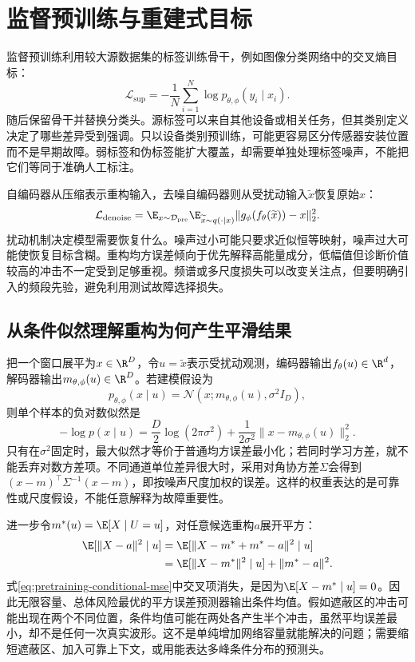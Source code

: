\section{监督预训练与重建式目标}
监督预训练利用较大源数据集的标签训练骨干，例如图像分类网络中的交叉熵目标\cite{he2016resnet}：
\begin{equation}
 \mathcal L_{\mathrm{sup}}=-\frac1N\sum_{i=1}^{N}
 \log p_{\theta,\phi}(y_i\mid x_i).
\end{equation}
随后保留骨干并替换分类头。源标签可以来自其他设备或相关任务，但其类别定义决定了哪些差异受到强调。只以设备类别预训练，可能更容易区分传感器安装位置而不是早期故障。弱标签和伪标签能扩大覆盖，却需要单独处理标签噪声，不能把它们等同于准确人工标注。

自编码器从压缩表示重构输入，去噪自编码器则从受扰动输入$\widetilde x$恢复原始$x$\cite{vincent2008denoising}：
\begin{equation}
 \mathcal L_{\mathrm{denoise}}
 =\E_{x\sim\mathcal D_{\mathrm{pre}}}\E_{\widetilde x\sim q(\cdot\mid x)}
 \|g_\phi(f_\theta(\widetilde x))-x\|_2^2.
\end{equation}
扰动机制决定模型需要恢复什么。噪声过小可能只要求近似恒等映射，噪声过大可能使恢复目标含糊。重构均方误差倾向于优先解释高能量成分，低幅值但诊断价值较高的冲击不一定受到足够重视。频谱或多尺度损失可以改变关注点，但要明确引入的频段先验，避免利用测试故障选择损失。

\subsection{从条件似然理解重构为何产生平滑结果}
把一个窗口展平为$x\in\R^D$，令$u=\widetilde x$表示受扰动观测，编码器输出$f_\theta(u)\in\R^d$，解码器输出$m_{\theta,\phi}(u)\in\R^D$。若建模假设为
\begin{equation}
 p_{\theta,\phi}(x\mid u)=\mathcal N(x;m_{\theta,\phi}(u),\sigma^2 I_D),
\end{equation}
则单个样本的负对数似然是
\begin{equation}
 -\log p(x\mid u)=\frac D2\log(2\pi\sigma^2)
 +\frac1{2\sigma^2}\|x-m_{\theta,\phi}(u)\|_2^2.
\end{equation}
只有在$\sigma^2$固定时，最大似然才等价于普通均方误差最小化；若同时学习方差，就不能丢弃对数方差项。不同通道单位差异很大时，采用对角协方差$\Sigma$会得到$(x-m)^\top\Sigma^{-1}(x-m)$，即按噪声尺度加权的误差。这样的权重表达的是可靠性或尺度假设，不能任意解释为故障重要性。

进一步令$m^*(u)=\E[X\mid U=u]$，对任意候选重构$a$展开平方：
\begin{align}
 \E[\|X-a\|^2\mid u]
 &=\E[\|X-m^*+m^*-a\|^2\mid u]\\
 &=\E[\|X-m^*\|^2\mid u]+\|m^*-a\|^2.\label{eq:pretraining-conditional-mse}
\end{align}
式\eqref{eq:pretraining-conditional-mse}中交叉项消失，是因为$\E[X-m^*\mid u]=0$。因此无限容量、总体风险最优的平方误差预测器输出条件均值。假如遮蔽区的冲击可能出现在两个不同位置，条件均值可能在两处各产生半个冲击，虽然平均误差最小，却不是任何一次真实波形。这不是单纯增加网络容量就能解决的问题；需要缩短遮蔽区、加入可靠上下文，或用能表达多峰条件分布的预测头。

